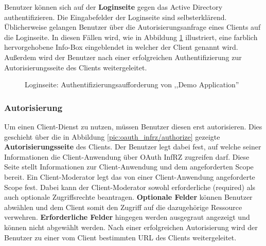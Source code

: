 \documentclass[12pt,a4paper,pointednumbers,abstracton]{scrartcl}
\begin{document}
Benutzer können sich auf der \textbf{Loginseite} gegen das Active Directory authentifizieren.
Die Eingabefelder der Loginseite sind selbsterklärend.
Üblicherweise gelangen Benutzer über die Autorisierungsanfrage eines Clients auf die Loginseite.
In diesen Fällen wird, wie in Abbildung \ref{pic:oauth_infrz/login_client} illustriert, eine farblich hervorgehobene Info-Box eingeblendet in welcher der Client genannt wird.
Außerdem wird der Benutzer nach einer erfolgreichen Authentifizierung zur Autorisierungsseite des Clients weitergeleitet.

\begin{figure}[h!]
\centering
{}
\caption{Loginseite: Authentifizierungsaufforderung von ,,Demo Application''}
\label{pic:oauth_infrz/login_client}
\end{figure}

\subsubsection{Autorisierung}

Um einen Client-Dienst zu nutzen, müssen Benutzer diesen erst autorisieren.
Dies geschieht über die in Abbildung \ref{pic:oauth_infrz/authorize} gezeigte \textbf{Autorisierungsseite} des Clients.
Der Benutzer legt dabei fest, auf welche seiner Informationen die Client-Anwendung über OAuth InfRZ zugreifen darf.
Diese Seite stellt Informationen zur Client-Anwendung und dem angeforderten Scope bereit.
Ein Client-Moderator legt das von einer Client-Anwendung angeforderte Scope fest.
Dabei kann der Client-Moderator sowohl erforderliche (required) als auch optionale Zugriffsrechte beantragen.
\textbf{Optionale Felder} können Benutzer abwählen und dem Client somit den Zugriff auf die dazugehörige Ressource verwehren.
\textbf{Erforderliche Felder} hingegen werden ausgegraut angezeigt und können nicht abgewählt werden.
Nach einer erfolgreichen Autorisierung wird der Benutzer zu einer vom Client bestimmten URL des Clients weitergeleitet.
\end{document}
